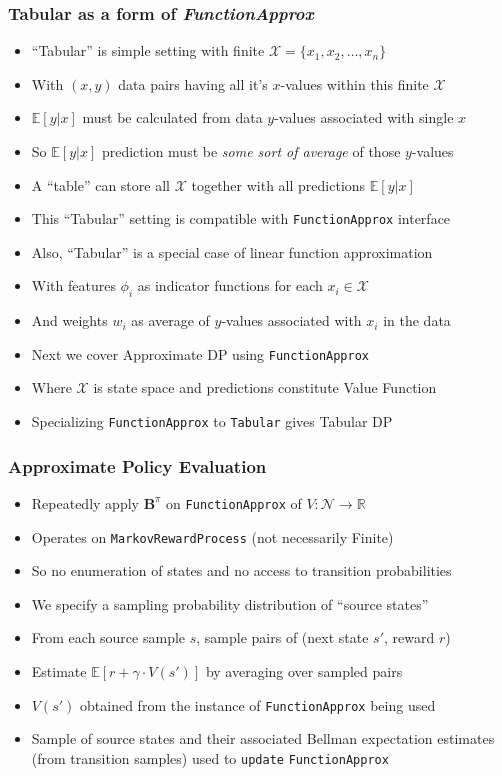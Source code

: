 \documentclass[handout]{beamer}
\begin{document}
\begin{frame}
\frametitle{Tabular as a form of {\em FunctionApprox}}
\pause
\begin{itemize}[<+->]
\item ``Tabular'' is simple setting with finite $\mathcal{X} = \{x_1, x_2, \ldots, x_n\}$
\item With $(x,y)$ data pairs having all it's $x$-values within this finite $\mathcal{X}$
\item $\mathbb{E}[y|x]$ must be calculated from data $y$-values associated with single $x$
\item So $\mathbb{E}[y|x]$ prediction must be {\em some sort of average} of those $y$-values
\item A ``table'' can store all $\mathcal{X}$ together with all predictions $\mathbb{E}[y|x]$
\item This ``Tabular'' setting is compatible with \lstinline{FunctionApprox} interface
\item Also, ``Tabular'' is a special case of linear function approximation
\item With features $\phi_i$ as indicator functions for each $x_i \in \mathcal{X}$
\item And weights $w_i$ as average of $y$-values associated with $x_i$ in the data
\item Next we cover Approximate DP using \lstinline{FunctionApprox}
\item Where $\mathcal{X}$ is state space and predictions constitute Value Function
\item Specializing \lstinline{FunctionApprox} to \lstinline{Tabular} gives Tabular DP
\end{itemize}
\end{frame}


\begin{frame}
\frametitle{Approximate Policy Evaluation}
\pause
\begin{itemize}[<+->]
\item Repeatedly apply $\bm{B}^{\pi}$ on \lstinline{FunctionApprox} of $V: \mathcal{N} \rightarrow \mathbb{R}$	
\item Operates on \lstinline{MarkovRewardProcess} (not necessarily Finite)
\item So no enumeration of states and no access to transition probabilities
\item We specify a sampling probability distribution of ``source states''
\item From each source sample $s$, sample pairs of (next state $s'$, reward $r$)
\item Estimate $\mathbb{E}[r + \gamma \cdot V(s')]$ by averaging over sampled pairs
\item  $V(s')$ obtained from the instance of \lstinline{FunctionApprox} being used
\item Sample of source states and their associated Bellman expectation estimates (from transition samples) used to \lstinline{update} \lstinline{FunctionApprox}
\end{itemize}
\end{frame}
\end{document}

